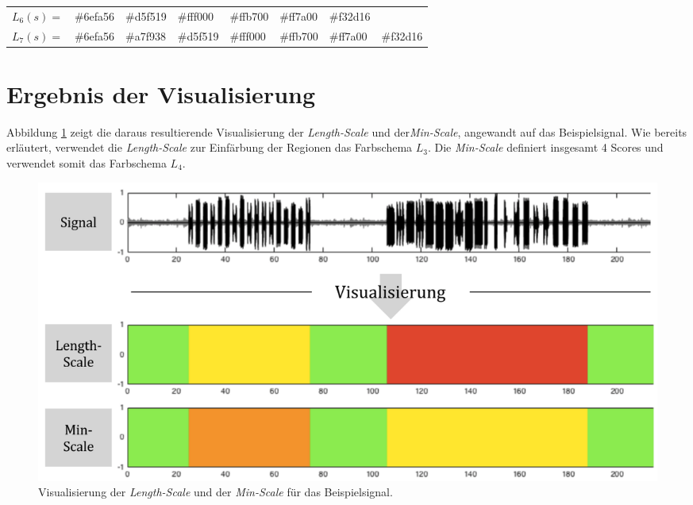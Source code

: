 \begin{table}[h]
\begin{tabular}{@{}clllllll@{}}
\multicolumn{1}{l|}{$L_6(s) = $} & \multicolumn{1}{l|}{\cellcolor[HTML]{6EFA56}\#6efa56} & \multicolumn{1}{l|}{\cellcolor[HTML]{D5F519}\#d5f519} & \multicolumn{1}{l|}{\cellcolor[HTML]{FFF000}\#fff000} & \multicolumn{1}{l|}{\cellcolor[HTML]{FFB700}\#ffb700} & \multicolumn{1}{l|}{\cellcolor[HTML]{FF7A00}\#ff7a00} & \multicolumn{1}{l|}{\cellcolor[HTML]{F32D16}\#f32d16} &                                                       \\ \cmidrule(l){2-8} 
\multicolumn{1}{l|}{$L_7(s) = $} & \multicolumn{1}{l|}{\cellcolor[HTML]{6EFA56}\#6efa56} & \multicolumn{1}{l|}{\cellcolor[HTML]{A7F938}\#a7f938} & \multicolumn{1}{l|}{\cellcolor[HTML]{D5F519}\#d5f519} & \multicolumn{1}{l|}{\cellcolor[HTML]{FFF000}\#fff000} & \multicolumn{1}{l|}{\cellcolor[HTML]{FFB700}\#ffb700} & \multicolumn{1}{l|}{\cellcolor[HTML]{FF7A00}\#ff7a00} & \multicolumn{1}{l|}{\cellcolor[HTML]{F32D16}\#f32d16} \\ \bottomrule
\end{tabular}
\end{table}

\section{Ergebnis der Visualisierung}
\label{sec:vizResults}

Abbildung \ref{fig:viz_without_t_01} zeigt die daraus resultierende Visualisierung der \emph{Length-Scale} und der\emph{Min-Scale}, angewandt auf das Beispielsignal. Wie bereits erläutert, verwendet die \emph{Length-Scale} zur Einfärbung der Regionen das Farbschema $L_3$. Die \emph{Min-Scale} definiert insgesamt 4 Scores und verwendet somit das Farbschema $L_4$.

\begin{figure}[h]
	\centering
	\includegraphics[width=1\textwidth]{bilder/viz_without_t_04.png}
	\caption{Visualisierung der \emph{Length-Scale} und der \emph{Min-Scale} für das Beispielsignal. }
	\label{fig:viz_without_t_01}
\end{figure}

